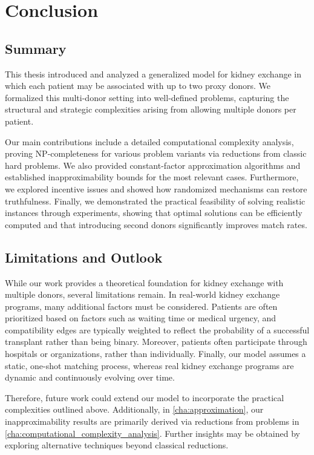 \chapter{Conclusion}
\label{cha:conclusion}



\section{Summary}

This thesis introduced and analyzed a generalized model for kidney exchange in which each patient may be associated with up to two proxy donors. We formalized this multi-donor setting into well-defined problems, capturing the structural and strategic complexities arising from allowing multiple donors per patient.

Our main contributions include a detailed computational complexity analysis, proving NP-completeness for various problem variants via reductions from classic hard problems. We also provided constant-factor approximation algorithms and established inapproximability bounds for the most relevant cases. Furthermore, we explored incentive issues and showed how randomized mechanisms can restore truthfulness. Finally, we demonstrated the practical feasibility of solving realistic instances through experiments, showing that optimal solutions can be efficiently computed and that introducing second donors significantly improves match rates.

\section{Limitations and Outlook}

While our work provides a theoretical foundation for kidney exchange with multiple donors, several limitations remain. In real-world kidney exchange programs, many additional factors must be considered. Patients are often prioritized based on factors such as waiting time or medical urgency, and compatibility edges are typically weighted to reflect the probability of a successful transplant rather than being binary. Moreover, patients often participate through hospitals or organizations, rather than individually. Finally, our model assumes a static, one-shot matching process, whereas real kidney exchange programs are dynamic and continuously evolving over time.

Therefore, future work could extend our model to incorporate the practical complexities outlined above. Additionally, in \autoref{cha:approximation}, our inapproximability results are primarily derived via reductions from problems in \autoref{cha:computational_complexity_analysis}. Further insights may be obtained by exploring alternative techniques beyond classical reductions.



